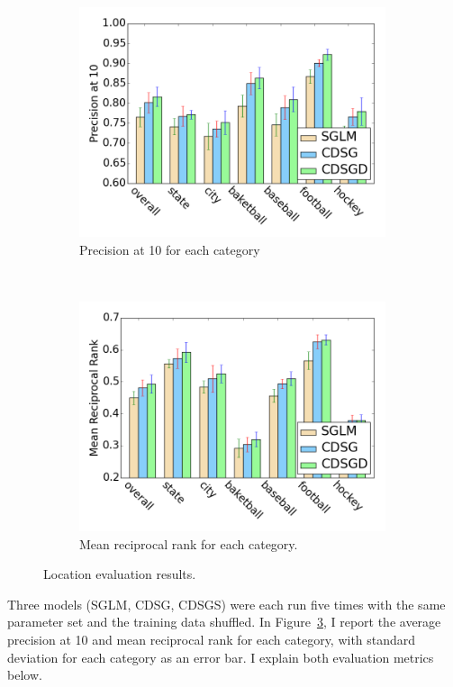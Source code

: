 \documentclass[a4paper,12pt,twoside,openright]{report}
\begin{document}
\begin{figure}[htbp]
	\hspace{-2.3cm}
        \begin{subfigure}[b]{9cm}
                \includegraphics[width=9cm]{figs/chap5/loc_prec.png}
                \caption{Precision at 10 for each category}
                \label{fig:chap5:loc_prec}
        \end{subfigure}%
        ~ %
        \begin{subfigure}[b]{9cm}
                \includegraphics[width=9cm]{figs/chap5/loc_mrr.png}
                \caption{Mean reciprocal rank for each category.}
                \label{fig:chap5:loc_mrr}
        \end{subfigure}
	\captionsetup{justification=centering}
        \caption[Location evaluation results.]{Location evaluation results.}
        \label{fig:chap5:loc_eval}
\end{figure}

Three models (SGLM, CDSG, CDSGS) were each run five times with the same parameter set and the training data shuffled. In Figure~\ref{fig:chap5:loc_eval}, I report the average precision at 10 and mean reciprocal rank for each category, with standard deviation for each category as an error bar. I explain both evaluation metrics below.
\end{document}
